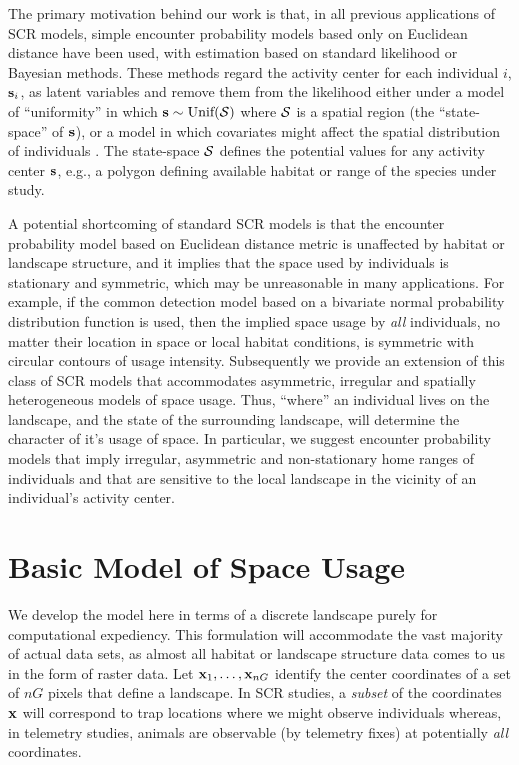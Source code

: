 \documentclass[12pt]{article}
\begin{document}
The primary motivation behind our work is that, in all previous
applications of SCR models, simple encounter probability models based
only on Euclidean distance have been used, with estimation based on
standard likelihood or Bayesian methods. These methods regard the
activity center for each individual $i$, ${\bf s}_{i}$, as latent
variables and remove them from the likelihood either under a model of
``uniformity'' in which ${\bf s} \sim \mbox{Unif}({\cal S})$ where
${\cal S}$ is a spatial region (the ``state-space'' of ${\bf s}$), or
a model in which covariates might affect the spatial distribution of
individuals \citep{borchers_efford:2008}. The state-space ${\cal S}$
defines the potential values for any activity center ${\bf s}$, e.g.,
a polygon defining available habitat or range of the species under
study.

A
potential shortcoming of
standard SCR models is that the encounter
probability model based on Euclidean distance metric is unaffected by
habitat or landscape structure, and it implies that the space used by
individuals is stationary and symmetric, which may be unreasonable in
many applications.  For example, if the common detection model based
on a bivariate normal probability distribution function is used, then
the implied space usage by {\it all} individuals, no matter their
location in space or local habitat conditions, is symmetric with
circular contours of usage intensity.  Subsequently we provide an
extension of this class of SCR models that accommodates asymmetric,
irregular and spatially heterogeneous models of space usage.  Thus,
``where'' an individual lives on the landscape, and the state of the
surrounding landscape, will determine the character of it's usage of
space. In particular, we suggest encounter probability models that
imply irregular, asymmetric and non-stationary home ranges of
individuals and that are sensitive to the local landscape in the
vicinity of an individual's activity center.

\section{Basic Model of Space Usage}
\label{rsf.sec.rsfmodel}

We develop the model here in terms of a discrete landscape purely for
computational expediency. This formulation will accommodate the vast
majority of actual data sets, as almost all habitat or landscape
structure data comes to us in the form of raster data.  Let ${\bf
  x}_{1},\ldots,{\bf x}_{nG}$ identify the center coordinates of a set
of $nG$ pixels that define a landscape.  In SCR studies, a {\it
  subset} of the coordinates ${\bf x}$ will correspond to trap
locations where we might observe individuals whereas, in telemetry
studies, animals are observable (by telemetry fixes) at potentially
{\it all} coordinates.
\end{document}
